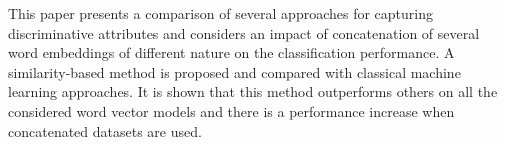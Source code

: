 This paper presents a comparison of several approaches for capturing discriminative attributes and considers an impact of concatenation of several word embeddings of different nature on the classification performance. A similarity-based method is proposed and compared with classical machine learning approaches. It is shown that this method outperforms others on all the considered word vector models and there is a performance increase when concatenated datasets are used.
